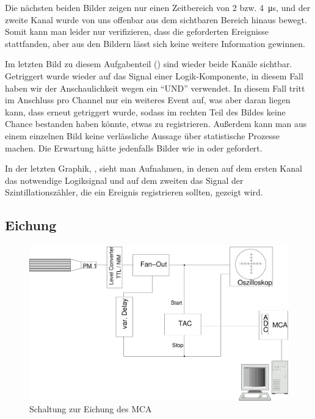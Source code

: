 Die nächsten beiden Bilder zeigen nur einen Zeitbereich von 2 bzw.
\SI{4}{\micro\second}, und der zweite Kanal wurde von uns offenbar aus dem
sichtbaren Bereich hinaus bewegt. Somit kann man leider nur verifizieren, dass
die geforderten Ereignisse stattfanden, aber aus den Bildern lässt sich keine
weitere Information gewinnen. 

Im letzten Bild zu diesem Aufgabenteil () sind wieder beide
Kanäle sichtbar. Getriggert wurde wieder auf das Signal einer Logik-Komponente,
in diesem Fall haben wir der Anschaulichkeit wegen ein ``UND'' verwendet. In
diesem Fall tritt im Anschluss pro Channel nur ein weiteres Event auf, was aber
daran liegen kann, dass erneut getriggert wurde, sodass im rechten Teil des
Bildes keine Chance bestanden haben könnte, etwas zu registrieren. Außerdem
kann man aus einem einzelnen Bild keine verlässliche Aussage über statistische
Prozesse machen. Die Erwartung hätte jedenfalls Bilder wie in
 oder  gefordert.

In der letzten Graphik, , sieht man Aufnahmen, in denen auf
dem ersten Kanal das notwendige Logiksignal und auf dem zweiten das Signal der
Szintillationszähler, die ein Ereignis registrieren sollten, gezeigt wird.


\subsection{Eichung}

\begin{figure}[ht!]
  \centering
  \includegraphics[width=\columnwidth,keepaspectratio=true]{zeit_schaltung}
  \caption{Schaltung zur Eichung des MCA}
  \label{fig:zeit_schaltung}
\end{figure}

